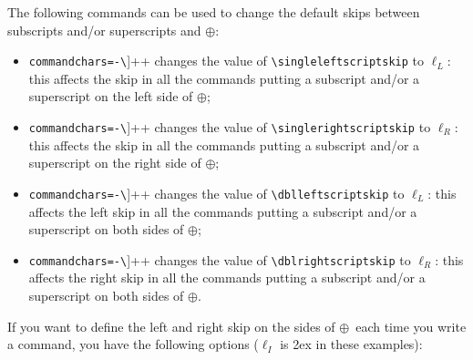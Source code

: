 \documentclass[green,a4paper,oneside,openany,noparindent,noparskip,article,nomatter]{bookest}
\newcommand{\choice}{\oplus} %
\newcommand{\Choice}{$\choice$}
\newcommand{\Elll}{$\ell_L$}
\newcommand{\Ellr}{$\ell_R$}
\begin{document}
The following commands can be used to change the default skips between subscripts and/or superscripts and \Choice:
\begin{itemize}
\item\Verb[commandchars=-\[\]]++ changes the value of \Verb+\singleleftscriptskip+ to \Elll: this affects the skip in all the commands putting a subscript and/or a superscript on the left side of \Choice;
\item\Verb[commandchars=-\[\]]++ changes the value of \Verb+\singlerightscriptskip+ to \Ellr: this affects the skip in all the commands putting a subscript and/or a superscript on the right side of \Choice;
\item\Verb[commandchars=-\[\]]++ changes the value of \Verb+\dblleftscriptskip+ to \Elll: this affects the left skip in all the commands putting a subscript and/or a superscript on both sides of \Choice;
\item\Verb[commandchars=-\[\]]++ changes the value of \Verb+\dblrightscriptskip+ to \Ellr: this affects the right skip in all the commands putting a subscript and/or a superscript on both sides of \Choice.
\end{itemize}

If you want to define the left and right skip on the sides of \Choice\ each time you write a command, you have the following options ($\ell_I$ is 2ex in these examples):
\end{document}
